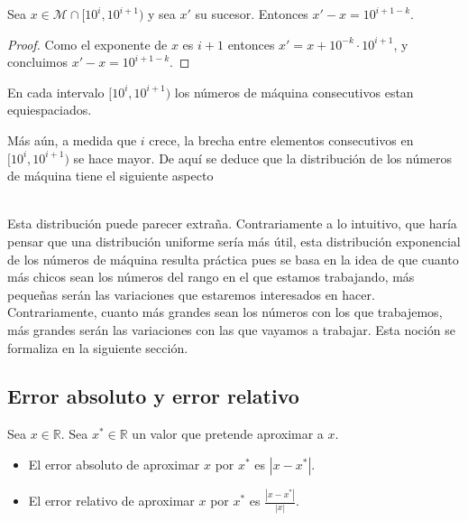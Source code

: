 \begin{lema}
Sea $x \in \mathcal{M} \cap [10^i, 10^{i + 1})$ y sea $x'$ su sucesor. Entonces $x' - x = 10^{i + 1 - k}$.

\begin{proof}
Como el exponente de $x$ es $i + 1$ entonces $x' = x + 10^{-k} \cdot 10^{i + 1}$, y concluimos $x' - x = 10^{i + 1 - k}$.
\end{proof}
\end{lema}

\begin{coro}
En cada intervalo $[10^i, 10^{i + 1})$ los números de máquina consecutivos estan equiespaciados.
\end{coro}

Más aún, a medida que $i$ crece, la brecha entre elementos consecutivos en $[10^i, 10^{i + 1})$ se hace mayor. De aquí se deduce que la distribución de los números de máquina tiene el siguiente aspecto
\\[0.5cm]
\begin{figure}[h]
\centering

\end{figure}\\[0.5cm]

Esta distribución puede parecer extraña. Contrariamente a lo intuitivo, que haría pensar que una distribución uniforme sería más útil, esta distribución exponencial de los números de máquina resulta práctica pues se basa en la idea de que cuanto más chicos sean los números del rango en el que estamos trabajando, más pequeñas serán las variaciones que estaremos interesados en hacer. Contrariamente, cuanto más grandes sean los números con los que trabajemos, más grandes serán las variaciones con las que vayamos a trabajar. Esta noción se formaliza en la siguiente sección.

\subsection{Error absoluto y error relativo}

\begin{defi} Sea $x \in \mathbb{R}$. Sea $x^* \in \mathbb{R}$ un valor que pretende aproximar a $x$. 
\begin{itemize}
	\item El error absoluto de aproximar $x$ por $x^*$ es $|x - x^*|$.
	\item El error relativo de aproximar $x$ por $x^*$ es $\frac{|x - x^*|}{|x|}$.
\end{itemize}
\end{defi}

